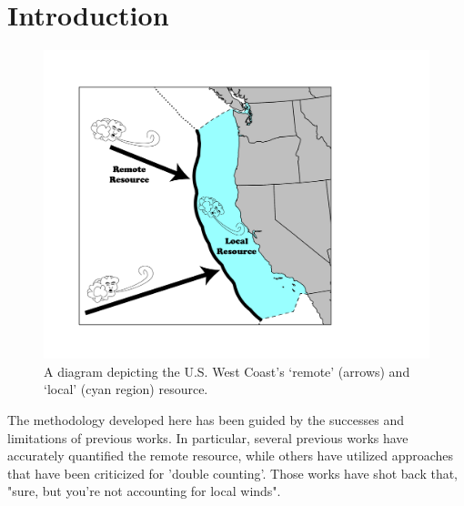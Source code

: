 \section{Introduction}




\begin{figure}[ht]
  \centering
  \includegraphics[width=0.9\linewidth]{../diagram/EEZ_contour03_edit01.png}
  \caption{A diagram depicting the U.S. West Coast’s ‘remote’ (arrows) and ‘local’ (cyan region) resource.}
  \label{fig:diagram:west-eez}
\end{figure}

The methodology developed here has been guided by the successes and limitations of previous works. In particular, several previous works have accurately quantified the remote resource, while others have utilized approaches that have been criticized for 'double counting'. Those works have shot back that, "sure, but you're not accounting for local winds".


